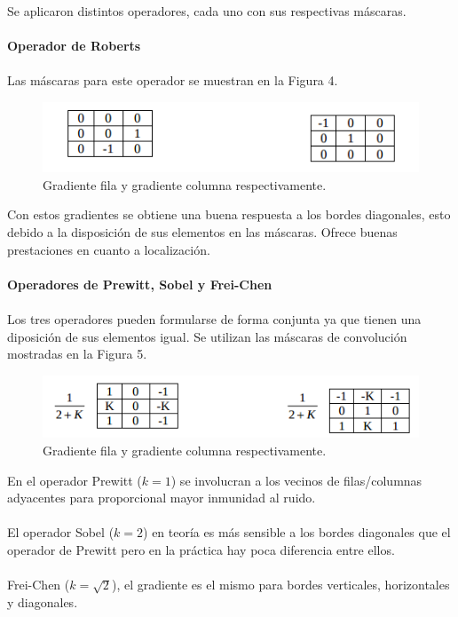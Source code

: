 \documentclass[conference]{IEEEtran}
\begin{document}
Se aplicaron distintos operadores, cada uno con sus respectivas m\'ascaras.\\\\
\textbf{Operador de Roberts\\\\}
Las m\'ascaras para este operador se muestran en la Figura 4.

\begin{figure}[h]
	\centering
	\setlength{\unitlength}{0.00105in}
	\includegraphics[scale=0.56]{./images/roberts.png}
	\caption{Gradiente fila y gradiente columna respectivamente.}
\end{figure}

Con estos gradientes se obtiene una buena respuesta a los bordes diagonales, esto debido a la disposici\'on de sus elementos en las m\'ascaras. Ofrece buenas prestaciones en cuanto a localizaci\'on.\\\\

\textbf{Operadores de Prewitt, Sobel y Frei-Chen\\\\}
Los tres operadores pueden formularse de forma conjunta ya que tienen una diposici\'on de sus elementos igual. Se utilizan las m\'ascaras de convoluci\'on mostradas en la Figura 5.

\begin{figure}[h]
	\centering
	\setlength{\unitlength}{0.00105in}
	\includegraphics[scale=0.50]{./images/gradientes.png}
	\caption{Gradiente fila y gradiente columna respectivamente.}
\end{figure}

En el operador Prewitt ($k=1$) se involucran a los vecinos de filas/columnas adyacentes para proporcional mayor inmunidad al ruido.\\\\
El operador Sobel ($k=2$) en teor\'ia es m\'as sensible a los bordes diagonales que el operador de Prewitt pero en la pr\'actica hay poca diferencia entre ellos.\\\\
Frei-Chen ($k=\sqrt{2}$), el gradiente es el mismo para bordes verticales, horizontales y diagonales.\\\\
\end{document}
